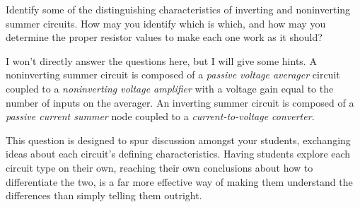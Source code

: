 

Identify some of the distinguishing characteristics of inverting and noninverting summer circuits.  How may you identify which is which, and how may you determine the proper resistor values to make each one work as it should?







I won't directly answer the questions here, but I will give some hints.  A noninverting summer circuit is composed of a {\it passive voltage averager} circuit coupled to a {\it noninverting voltage amplifier} with a voltage gain equal to the number of inputs on the averager.  An inverting summer circuit is composed of a {\it passive current summer} node coupled to a {\it current-to-voltage converter}.







This question is designed to spur discussion amongst your students, exchanging ideas about each circuit's defining characteristics.  Having students explore each circuit type on their own, reaching their own conclusions about how to differentiate the two, is a far more effective way of making them understand the differences than simply telling them outright.




